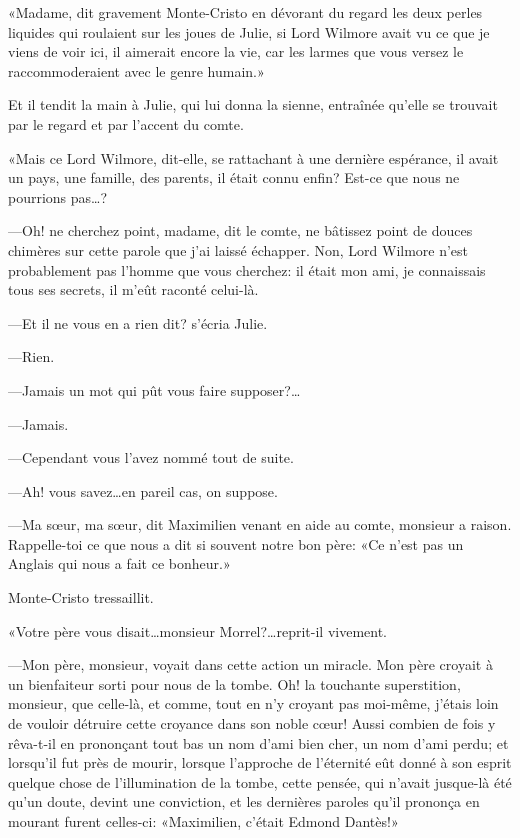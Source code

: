 «Madame, dit gravement Monte-Cristo en dévorant du regard les deux perles liquides qui roulaient sur les joues de Julie, si Lord Wilmore avait vu ce que je viens de voir ici, il aimerait encore la vie, car les larmes que vous versez le raccommoderaient avec le genre humain.» 

Et il tendit la main à Julie, qui lui donna la sienne, entraînée qu'elle se trouvait par le regard et par l'accent du comte. 

«Mais ce Lord Wilmore, dit-elle, se rattachant à une dernière espérance, il avait un pays, une famille, des parents, il était connu enfin? Est-ce que nous ne pourrions pas\dots? 

—Oh! ne cherchez point, madame, dit le comte, ne bâtissez point de douces chimères sur cette parole que j'ai laissé échapper. Non, Lord Wilmore n'est probablement pas l'homme que vous cherchez: il était mon ami, je connaissais tous ses secrets, il m'eût raconté celui-là. 

—Et il ne vous en a rien dit? s'écria Julie. 

—Rien.  

—Jamais un mot qui pût vous faire supposer?\dots 

—Jamais. 

—Cependant vous l'avez nommé tout de suite. 

—Ah! vous savez\dots en pareil cas, on suppose. 

—Ma sœur, ma sœur, dit Maximilien venant en aide au comte, monsieur a raison. Rappelle-toi ce que nous a dit si souvent notre bon père: «Ce n'est pas un Anglais qui nous a fait ce bonheur.» 

Monte-Cristo tressaillit.  

«Votre père vous disait\dots monsieur Morrel?\dots reprit-il vivement. 

—Mon père, monsieur, voyait dans cette action un miracle. Mon père croyait à un bienfaiteur sorti pour nous de la tombe. Oh! la touchante superstition, monsieur, que celle-là, et comme, tout en n'y croyant pas moi-même, j'étais loin de vouloir détruire cette croyance dans son noble cœur! Aussi combien de fois y rêva-t-il en prononçant tout bas un nom d'ami bien cher, un nom d'ami perdu; et lorsqu'il fut près de mourir, lorsque l'approche de l'éternité eût donné à son esprit quelque chose de l'illumination de la tombe, cette pensée, qui n'avait jusque-là été qu'un doute, devint une conviction, et les dernières paroles qu'il prononça en mourant furent celles-ci: «Maximilien, c'était Edmond Dantès!» 

